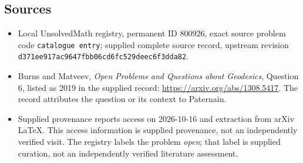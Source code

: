 \documentclass[11pt]{article}
\begin{document}
\subsection{Sources}
\begin{itemize}
\item Local UnsolvedMath registry, permanent ID \(800926\), exact source problem code \texttt{catalogue entry}; supplied complete source record, upstream revision \texttt{d371ee917ac9647fbb06cd6fc529deec6f3dda82}.
\item Burns and Matveev, \emph{Open Problems and Questions about Geodesics}, Question 6, listed as 2019 in the supplied record: \url{https://arxiv.org/abs/1308.5417}. The record attributes the question or its context to Paternain.
\item Supplied provenance reports access on 2026-10-16 and extraction from arXiv LaTeX. This access information is supplied provenance, not an independently verified visit. The registry labels the problem \emph{open}; that label is supplied curation, not an independently verified literature assessment.
\end{itemize}
\end{document}
